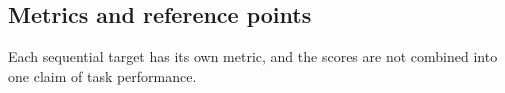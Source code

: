 \subsection{Metrics and reference points}

Each sequential target has its own metric, and the scores are not combined into one
claim of task performance.
